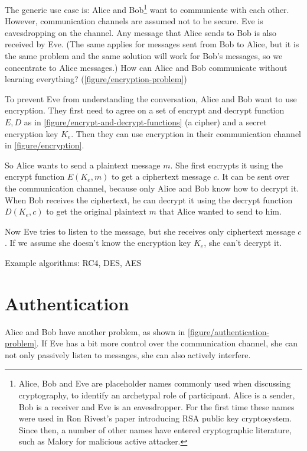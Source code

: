 The generic use case is: Alice and Bob\footnote{Alice, Bob and Eve are placeholder names commonly used when discussing cryptography, to identify an archetypal role of participant. Alice is a sender, Bob is a receiver and Eve is an eavesdropper. For the first time these names were used in Ron Rivest's paper introducing RSA public key cryptosystem. \cite{rsa} Since then, a number of other names have entered cryptographic literature, such as Malory for malicious active attacker.} want to communicate with each other. However, communication channels are assumed not to be secure. Eve is eavesdropping on the channel. Any message that Alice sends to Bob is also received by Eve. (The same applies for messages sent from Bob to Alice, but it is the same problem and the same solution will work for Bob's messages, so we concentrate to Alice messages.) How can Alice and Bob communicate without learning everything? (\autoref{figure/encryption-problem}) \cite[p.~23]{ferguson2010cryptography}

To prevent Eve from understanding the conversation, Alice and Bob want to use encryption. They first need to agree on a set of encrypt and decrypt function $E, D$ as in \autoref{figure/encrypt-and-decrypt-functions} (a cipher) and a secret encryption key $K_e$. Then they can use encryption in their communication channel in \autoref{figure/encryption}.

So Alice wants to send a plaintext message $m$. She first encrypts it using the encrypt function $E(K_e, m)$ to get a ciphertext message $c$. It can be sent over the communication channel, because only Alice and Bob know how to decrypt it. When Bob receives the ciphertext, he can decrypt it using the decrypt function $D(K_e, c)$ to get the original plaintext $m$ that Alice wanted to send to him.

Now Eve tries to listen to the message, but she receives only ciphertext message $c$. If we assume she doesn't know the encryption key $K_e$, she can't decrypt it.

Example algorithms: RC4, DES, AES





\section{Authentication}
\label{toc/authentication}

Alice and Bob have another problem, as shown in \autoref{figure/authentication-problem}. If Eve has a bit more control over the communication channel, she can not only passively listen to messages, she can also actively interfere.

